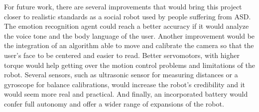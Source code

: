 \documentclass[runningheads,a4paper,12pt]{report}
\begin{document}
For future work, there are several improvements that would bring this project closer to realistic standards as a social robot used by people suffering from ASD. The emotion recognition agent could reach a better accuracy if it would analyze the voice tone and the body language of the user. Another improvement would be the integration of an algorithm able to move and calibrate the camera so that the user's face to be centered and easier to read. Better servomotors, with higher torque would help getting over the motion control problems and limitations of the robot. Several sensors, such as ultrasonic sensor for measuring distances or a gyroscope for balance calibrations, would increase the robot's credibility and it would seem more real and practical. And finally, an incorporated battery would confer full autonomy and offer a wider range of expansions of the robot. 
\end{document}
